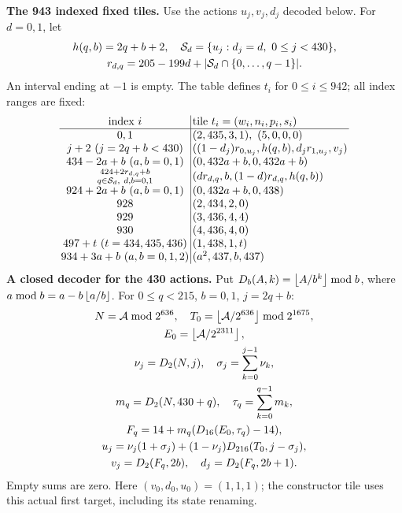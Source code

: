 \textbf{The 943 indexed fixed tiles.}
Use the actions $u_j,v_j,d_j$ decoded below. For $d=0,1$, let
\[
\begin{gathered}
h(q,b)=2q+b+2,\quad
\mathcal S_d=\{u_j:d_j=d,\ 0\le j<430\},\\
r_{d,q}=205-199d+|\mathcal S_d\cap\{0,\ldots,q-1\}|.
\end{gathered}
\]
An interval ending at $-1$ is empty. The table defines $t_i$ for
$0\le i\le942$; all index ranges are fixed:
\[
\setlength{\arraycolsep}{1.4pt}\begin{array}{c|l}
\text{index }i&\text{tile }t_i=(w_i,n_i,p_i,s_i)\\\hline
0,1&(2,435,3,1),\ (5,0,0,0)\\
j+2\ (j=2q+b<430)&((1-d_j)r_{0,u_j},h(q,b),d_jr_{1,u_j},v_j)\\
434-2a+b\ (a,b=0,1)&(0,432a+b,0,432a+b)\\
\substack{424+2r_{d,q}+b\\q\in\mathcal S_d,\ d,b=0,1}&(dr_{d,q},b,(1-d)r_{d,q},h(q,b))\\
924+2a+b\ (a,b=0,1)&(0,432a+b,0,438)\\
928&(2,434,2,0)\\
929&(3,436,4,4)\\
930&(4,436,4,0)\\
497+t\ (t=434,435,436)&(1,438,1,t)\\
934+3a+b\ (a,b=0,1,2)&(a^2,437,b,437)
\end{array}
\]
\textbf{A closed decoder for the 430 actions.}
Put $D_b(A,k)=\left\lfloor A/b^k\right\rfloor\bmod b$, where
$a\bmod b=a-b\left\lfloor a/b\right\rfloor$. For $0\le q<215$, $b=0,1$, $j=2q+b$:
\[
\begin{gathered}
N=\mathcal A\bmod2^{636},\quad
T_0=\left\lfloor\mathcal A/2^{636}\right\rfloor\bmod2^{1675},\\
E_0=\left\lfloor\mathcal A/2^{2311}\right\rfloor,\\
\nu_j=D_2(N,j),\quad \sigma_j=\sum_{k=0}^{j-1}\nu_k,\\
m_q=D_2(N,430+q),\quad \tau_q=\sum_{k=0}^{q-1}m_k,\\
F_q=14+m_q(D_{16}(E_0,\tau_q)-14),\\
u_j=\nu_j(1+\sigma_j)+(1-\nu_j)D_{216}(T_0,j-\sigma_j),\\
v_j=D_2(F_q,2b),\quad d_j=D_2(F_q,2b+1).
\end{gathered}
\]
Empty sums are zero. Here $(v_0,d_0,u_0)=(1,1,1)$; the constructor tile
uses this actual first target, including its state renaming.


